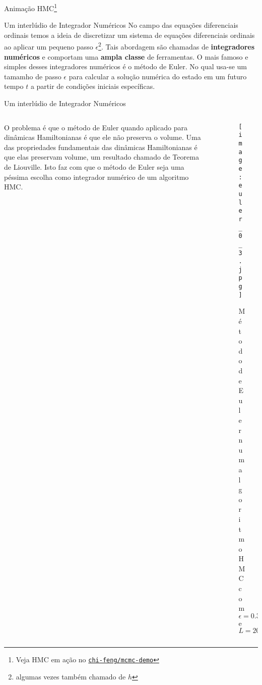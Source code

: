 \begin{frame}{Animação HMC\footnote{Veja HMC em ação no \href{https://chi-feng.github.io/mcmc-demo/app.html?algorithm=HamiltonianHMC&target=banana}{\texttt{chi-feng/mcmc-demo}}}}
  \centering
\end{frame}

\begin{frame}{Um interlúdio de Integrador Numéricos}
  No campo das equações diferenciais ordinais temos a ideia de discretizar um
  sistema de equações diferenciais ordinais ao aplicar um pequeno passo $\epsilon$\footnote{algumas vezes também chamado de $h$}.
  Tais abordagem são chamadas de \textbf{integradores numéricos} e comportam uma
  \textbf{ampla classe} de ferramentas.
  \vfill
  O mais famoso e simples desses integradores numéricos é o método de Euler. No qual
  usa-se um tamamho de passo $\epsilon$ para calcular a solução numérica do estado
  em um futuro tempo $t$ a partir de condições iniciais específicas.
\end{frame}

\begin{frame}{Um interlúdio de Integrador Numéricos}
  \begin{columns}
    \begin{column}{0.6\textwidth}
      O problema é que o método de Euler quando aplicado para dinâmicas Hamiltonianas
      é que ele não preserva o volume. Uma das propriedades fundamentais das dinâmicas
      Hamiltonianas é que elas preservam volume, um resultado chamado de Teorema de
      Liouville. Isto faz com que o método de Euler seja uma péssima escolha como
      integrador numérico de um algoritmo HMC.
    \end{column}
    \begin{column}{0.4\textwidth}
      \begin{figure}
      \texttt{[image: euler\_0\_3.jpg]}
      \caption{Método de Euler num algoritmo HMC com $\epsilon = 0.3$ e $L = 20$}
      \end{figure}
    \end{column}
  \end{columns}
\end{frame}

